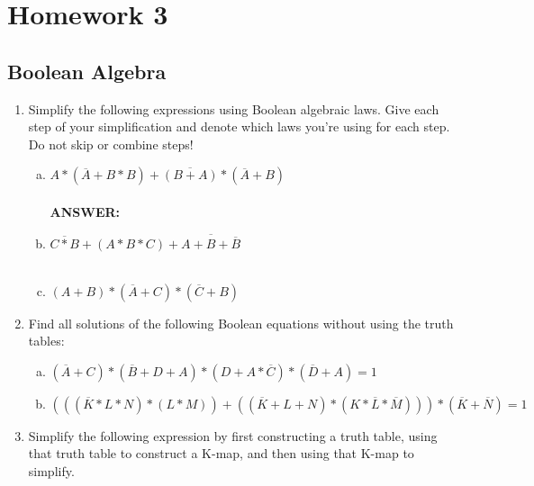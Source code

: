 \documentclass[11pt]{article}
\begin{document}
\section{Homework 3}

\subsection{Boolean Algebra}
\begin{enumerate}
    \item Simplify the following expressions using Boolean algebraic laws. Give each step of your simplification and denote which laws you’re using for each step. Do not skip or combine steps!
    \begin{enumerate}[(a)]
        \item  $A * (\overline{A}+B*B) + \overline{(B+A)} * (\overline{A} + B)$\\
        \\\textbf{ANSWER:}

        \item $\overline{C * B} + ( A * B * C) + \overline{A + B + \overline{B}}$\\
        \\
        \item $(A + B) * (\overline{A} + C) * (\overline{C} + B)$
    \end{enumerate}
    
    \item Find all solutions of the following Boolean equations without using the truth tables:
    \begin{enumerate}[(a)]
        \item $(\overline{A} + C) * (\overline{B} + D + A) * (D + A * \overline{C}) * (\overline{D} + A) = 1$
        \item $(((\overline{K} * L * N) * (L * M)) + ((\overline{K} + L + N) * (K * \overline{L} * \overline{M}))) * (\overline{K} + \overline{N}) = 1$
    \end{enumerate}

    \item Simplify the following expression by first constructing a truth table, using that truth table to
    construct a K-map, and then using that K-map to simplify.

\end{enumerate}
\end{document}
